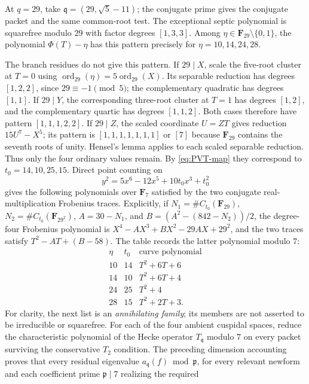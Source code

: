 \documentclass[11pt]{article}
\newcommand{\F}{\mathbf F}
\newcommand{\ord}{\operatorname{ord}}
\theoremstyle{definition}
\theoremstyle{remark}
\begin{document}
At $q=29$, take
$\mathfrak q=(29,\sqrt5-11)$; the conjugate prime gives the conjugate
packet and the same common-root test.  The exceptional septic polynomial
is squarefree modulo $29$ with factor degrees $[1,3,3]$.  Among
$\eta\in\F_{29}\setminus\{0,1\}$, the polynomial $\Phi(T)-\eta$ has
this pattern precisely for $\eta=10,14,24,28$.

The branch residues do not give this pattern.  If $29\mid X$, scale the
five-root cluster at $T=0$ using $\ord_{29}(\eta)=5\ord_{29}(X)$.
Its separable reduction has degrees $[1,2,2]$, since $29\equiv-1\pmod5$;
the complementary quadratic has degrees $[1,1]$.  If $29\mid Y$, the
corresponding three-root cluster at $T=1$ has degrees $[1,2]$, and the
complementary quartic has degrees $[1,1,2]$.  Both cases therefore have
pattern $[1,1,1,2,2]$.  If $29\mid Z$, the scaled coordinate $U=ZT$
gives reduction $15U^7-X^5$; its pattern is $[1,1,1,1,1,1,1]$ or $[7]$
because $\F_{29}$ contains the seventh roots of unity.  Hensel's lemma
applies to each scaled separable reduction.  Thus only the four ordinary
values remain.  By \eqref{eq:PVT-map} they correspond to
$t_0=14,10,25,15$.  Direct point counting on
\[
                y^2=5x^6-12x^5+10t_0x^3+t_0^2
\]
gives the following polynomials over $\F_7$ satisfied by the two
conjugate real-multiplication Frobenius traces.  Explicitly, if
$N_1=\#C_{t_0}(\F_{29})$, $N_2=\#C_{t_0}(\F_{29^2})$,
$A=30-N_1$, and $B=(A^2-(842-N_2))/2$, the degree-four Frobenius
polynomial is $X^4-AX^3+BX^2-29AX+29^2$, and the two traces satisfy
$T^2-AT+(B-58)$.  The table records the latter polynomial modulo $7$:
\begin{equation}\label{eq:curve-polynomials}
\begin{array}{c|c|c}
\eta&t_0&\text{curve polynomial}\\ \hline
10&14&T^2+6T+6\\
14&10&T^2+6T+4\\
24&25&T^2+4\\
28&15&T^2+2T+3.
\end{array}
\end{equation}
For clarity, the next list is an \emph{annihilating family}; its members are
not asserted to be irreducible or squarefree.  For each of the four ambient
cuspidal spaces, reduce the characteristic polynomial of the Hecke operator
$T_{\mathfrak q}$ modulo $7$ on every packet surviving the conservative
$T_2$ condition.  The preceding dimension accounting proves that every
residual eigenvalue $a_{\mathfrak q}(f)\bmod\mathfrak p$, for every relevant
newform and each coefficient prime $\mathfrak p\mid7$ realizing the required
\end{document}
